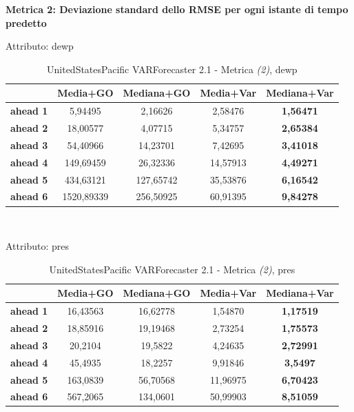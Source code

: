 \documentclass[12pt,a4paper,oneside,openright]{book}
\begin{document}
\textbf{Metrica 2: Deviazione standard dello RMSE per ogni istante di tempo predetto}

\medskip


Attributo: dewp \\

\begin{table}[H]
\centering
\begin{tabular}{|c|c|c|c|c|}
\hline
 & \textbf{Media+GO} & \textbf{Mediana+GO} & \textbf{Media+Var} & \textbf{Mediana+Var} \\
\hline
\textbf{ahead 1} & 5,94495 & 2,16626 & 2,58476 & \textbf{1,56471} \\
\hline
\textbf{ahead 2} & 18,00577 & 4,07715 & 5,34757 & \textbf{2,65384} \\
\hline
\textbf{ahead 3} & 54,40966 & 14,23701 & 7,42695 & \textbf{3,41018} \\
\hline
\textbf{ahead 4} & 149,69459 & 26,32336 & 14,57913 & \textbf{4,49271} \\
\hline
\textbf{ahead 5} & 434,63121 & 127,65742 & 35,53876 & \textbf{6,16542} \\
\hline
\textbf{ahead 6} & 1520,89339 & 256,50925 & 60,91395 & \textbf{9,84278} \\
\hline
\end{tabular} \\
\caption{UnitedStatesPacific VARForecaster 2.1 - Metrica \textit{(2)}, dewp}
\end{table}

\medskip

Attributo: pres \\ 

\begin{table}[H]
\centering
\begin{tabular}{|c|c|c|c|c|}
\hline
 & \textbf{Media+GO} & \textbf{Mediana+GO} & \textbf{Media+Var} & \textbf{Mediana+Var} \\
\hline
\textbf{ahead 1} & 16,43563 & 16,62778 & 1,54870 & \textbf{1,17519} \\
\hline
\textbf{ahead 2} & 18,85916 & 19,19468 & 2,73254 & \textbf{1,75573} \\
\hline
\textbf{ahead 3} & 20,2104 & 19,5822 & 4,24635 & \textbf{2,72991} \\
\hline
\textbf{ahead 4} & 45,4935 & 18,2257 & 9,91846 & \textbf{3,5497} \\
\hline
\textbf{ahead 5} & 163,0839 & 56,70568 & 11,96975 & \textbf{6,70423} \\
\hline
\textbf{ahead 6} & 567,2065 & 134,0601 & 50,99903 & \textbf{8,51059} \\
\hline
\end{tabular} \\
\caption{UnitedStatesPacific VARForecaster 2.1 - Metrica \textit{(2)}, pres}
\end{table}
\end{document}
